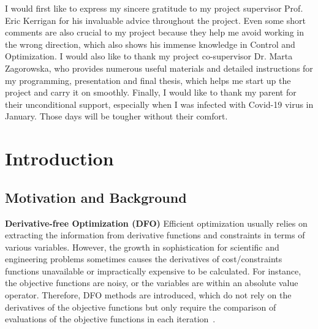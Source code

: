 \documentclass[11pt,oneside,onecolumn,openright]{article}
\begin{document}
\begin{spacing}{1}
\begin{acknowledgements}
  I would first like to express my sincere gratitude to my project supervisor Prof. Eric Kerrigan for his invaluable advice throughout the project. Even some short comments are also crucial to my project because they help me avoid working in the wrong direction, which also shows his immense knowledge in Control and Optimization.
  \newline\newline
  \noindent I would also like to thank my project co-supervisor Dr. Marta Zagorowska, who provides numerous useful materials and detailed instructions for my programming, presentation and final thesis, which helps me start up the project and carry it on smoothly.
  \newline\newline
  \noindent Finally, I would like to thank my parent for their unconditional support, especially when I was infected with Covid-19 virus in January. Those days will be tougher without their comfort.
\end{acknowledgements}
\cleardoublepage
\setcounter{tocdepth}{2}
\tableofcontents

\end{spacing}
\newpage
{}

\section{Introduction}
  \subsection{Motivation and Background}
  \textbf{Derivative-free Optimization (DFO) } Efficient optimization usually relies on extracting the information from derivative functions and constraints in terms of various variables. However, the growth in sophistication for scientific and engineering problems sometimes causes the derivatives of cost/constraints functions unavailable or impractically expensive to be calculated. For instance, the objective functions are noisy, or the variables are within an absolute value operator. Therefore, DFO methods are introduced, which do not rely on the derivatives of the objective functions but only require the comparison of evaluations of the objective functions in each iteration~\cite{larson2019derivative,dejemeppe2015derivative}. 
\end{document}
